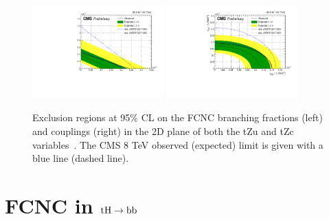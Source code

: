 \documentclass{PoS}
\begin{document}
\begin{figure}[htb]
\centering
\includegraphics[width=0.45\textwidth]{figures/CMS-PAS-TOP-17-017_Figure_007-a}
\includegraphics[width=0.45\textwidth]{figures/CMS-PAS-TOP-17-017_Figure_007-b}
\caption{
  Exclusion regions at 95\% CL on the FCNC branching fractions (left)
  and couplings (right) in the 2D plane of both the tZu and tZc
  variables~\cite{top-17-017}. The CMS 8 TeV observed (expected)
  limit is given with a blue line (dashed line).
}
\label{fig:TOP-17-017_Figure_007}
\end{figure}


\section{FCNC in ${\rm tH \to bb}$}
\end{document}
